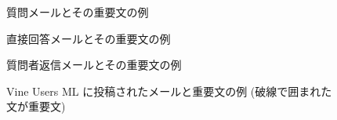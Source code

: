   \begin{figure}[t]
   \begin{center}
    
    

    質問メールとその重要文の例

    \vspace{1mm}

    

    直接回答メールとその重要文の例

    \vspace{1mm}

    

    質問者返信メールとその重要文の例

    \vspace{1mm}

    
    \caption{Vine Users ML に投稿されたメールと重要文の例 (破線で囲まれた文が重要文)}
    \label{fig:Vine Users ML に投稿されたメールと重要文の例}
   \end{center}
  \end{figure}

